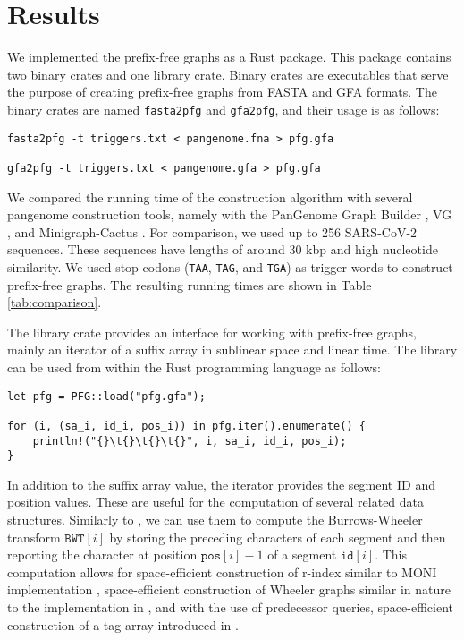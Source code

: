\section{Results}
We implemented the prefix-free graphs as a Rust package.
This package contains two binary crates and one library crate.
Binary crates are executables that serve the purpose of creating prefix-free graphs from FASTA and GFA formats.
The binary crates are named \texttt{fasta2pfg} and \texttt{gfa2pfg}, and their usage is as follows:

\begin{verbatim}
fasta2pfg -t triggers.txt < pangenome.fna > pfg.gfa

gfa2pfg -t triggers.txt < pangenome.gfa > pfg.gfa
\end{verbatim}

We compared the running time of the construction algorithm with several pangenome construction tools, namely with the PanGenome Graph Builder \cite{garrison2023building}, VG \cite{garrison2018variation}, and Minigraph-Cactus \cite{hickey2023pangenome}.
For comparison, we used up to 256 SARS-CoV-2 sequences.
These sequences have lengths of around 30 kbp and high nucleotide similarity.
We used stop codons (\texttt{TAA}, \texttt{TAG}, and \texttt{TGA}) as trigger words to construct prefix-free graphs.
The resulting running times are shown in Table \ref{tab:comparison}.



The library crate provides an interface for working with prefix-free graphs, mainly an iterator of a suffix array in sublinear space and linear time.
The library can be used from within the Rust programming language as follows:

\begin{verbatim}
let pfg = PFG::load("pfg.gfa");

for (i, (sa_i, id_i, pos_i)) in pfg.iter().enumerate() {
    println!("{}\t{}\t{}\t{}", i, sa_i, id_i, pos_i);
}
\end{verbatim}

In addition to the suffix array value, the iterator provides the segment ID and position values.
These are useful for the computation of several related data structures.
Similarly to \citet{2019boucher}, we can use them to compute the Burrows-Wheeler transform $\texttt{BWT}[i]$ by storing the preceding characters of each segment and then reporting the character at position $\texttt{pos}[i]-1$ of a segment $\texttt{id}[i]$.
This computation allows for space-efficient construction of r-index \cite{gagie2020fully} similar to MONI implementation \cite{rossi2022moni}, space-efficient construction of Wheeler graphs similar in nature to the implementation in \citet{2022pfwg}, and with the use of predecessor queries, space-efficient construction of a tag array introduced in \citet{2022maria}.

